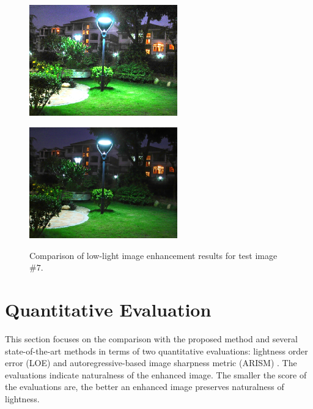 \begin{figure}[htbp]
\begin{minipage}[b]{0.49\hsize}
		 \label{fig:qualitative/2/rrm}
	\end{minipage} \\
	\begin{minipage}[b]{0.49\hsize}
	\centering
	\includegraphics[width=64mm, height=48mm]{images/experiment/qualitative/comp2/2/lime.eps}
	 \label{fig:qualitative/2/lime}
	\end{minipage}
	\begin{minipage}[b]{0.49\hsize}
	\centering
	\includegraphics[width=64mm, height=48mm]{images/experiment/qualitative/comp2/2/prop.eps}
	 \label{fig:qualitative/2/prop}
	\end{minipage}
	\caption{Comparison of low-light image enhancement results for test image $\#7$.}
	\label{fig:qualitative/2}
\end{figure}

\section{Quantitative Evaluation} \label{sec:quantitative}
This section focuses on the comparison with the proposed method and several state-of-the-art methods in terms of two quantitative evaluations: lightness order error (LOE) \cite{loe} and autoregressive-based image sharpness metric (ARISM) \cite{arism}. The evaluations indicate naturalness of the enhanced image. The smaller the score of the evaluations are, the better an enhanced image preserves naturalness of lightness.\par

